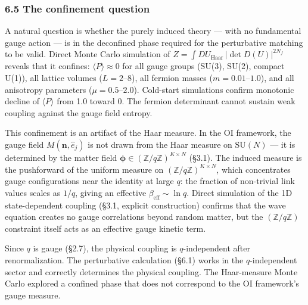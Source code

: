 \documentclass[
]{article}
\begin{document}
\hypertarget{the-confinement-question}{%
\subsubsection{6.5 The confinement
question}\label{the-confinement-question}}

A natural question is whether the purely induced theory --- with no
fundamental gauge action --- is in the deconfined phase required for the
perturbative matching to be valid. Direct Monte Carlo simulation of
\(Z = \int DU_{\text{Haar}} \, |\det D(U)|^{2N_f}\) reveals that it
confines: \(\langle P \rangle \approx 0\) for all gauge groups (SU(3),
SU(2), compact U(1)), all lattice volumes (\(L = 2\)--\(8\)), all
fermion masses (\(m = 0.01\)--\(1.0\)), and all anisotropy parameters
(\(\mu = 0.5\)--\(2.0\)). Cold-start simulations confirm monotonic
decline of \(\langle P \rangle\) from 1.0 toward 0. The fermion
determinant cannot sustain weak coupling against the gauge field
entropy.

This confinement is an artifact of the Haar measure. In the OI
framework, the gauge field \(M(\mathbf{n}, \hat{e}_j)\) is not drawn
from the Haar measure on \(\mathrm{SU}(N)\) --- it is determined by the
matter field
\(\boldsymbol{\phi} \in (\mathbb{Z}/q\mathbb{Z})^{K \times N}\) (§3.1).
The induced measure is the pushforward of the uniform measure on
\((\mathbb{Z}/q\mathbb{Z})^{K \times N}\), which concentrates gauge
configurations near the identity at large \(q\): the fraction of
non-trivial link values scales as \(1/q\), giving an effective
\(\beta_{\text{eff}} \sim \ln q\). Direct simulation of the 1D
state-dependent coupling (§3.1, explicit construction) confirms that the
wave equation creates no gauge correlations beyond random matter, but
the \((\mathbb{Z}/q\mathbb{Z})\) constraint itself acts as an effective
gauge kinetic term.

Since \(q\) is gauge (§2.7), the physical coupling is \(q\)-independent
after renormalization. The perturbative calculation (§6.1) works in the
\(q\)-independent sector and correctly determines the physical coupling.
The Haar-measure Monte Carlo explored a confined phase that does not
correspond to the OI framework's gauge measure.
\end{document}
